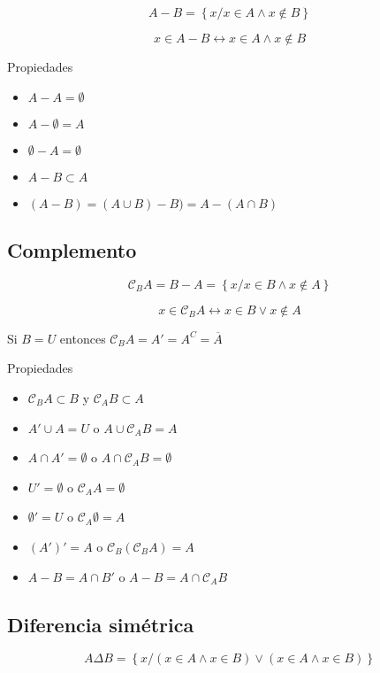 \documentclass[
  16pt,
]{krantz}
\providecommand{\tightlist}{%
  \setlength{\itemsep}{0pt}\setlength{\parskip}{0pt}}
\theoremstyle{definition}
\theoremstyle{definition}
\theoremstyle{definition}
\theoremstyle{definition}
\theoremstyle{remark}
\begin{document}
\[
A- B=\left\{x/x\in A\wedge x\notin B\right\}
\]

\[
x\in A- B\leftrightarrow x\in A\wedge x\notin B
\]

Propiedades

\begin{itemize}
\tightlist
\item
  \(A- A=\emptyset\)
\item
  \(A- \emptyset=A\)
\item
  \(\emptyset-A=\emptyset\)
\item
  \(A- B\subset A\)
\item
  \((A-B)=(A\cup B)-B)=A-(A\cap B)\)
\end{itemize}

\hypertarget{complemento}{%
\subsection{Complemento}\label{complemento}}

\[
\mathcal{C}_BA=B-A=\left\{x/x\in B\wedge x\notin A\right\}
\]

\[
x\in \mathcal{C}_BA\leftrightarrow x\in B\vee x\notin A
\]

Si \(B=U\) entonces \(\mathcal{C}_BA=A'=A^C=\overline{A}\)

Propiedades

\begin{itemize}
\tightlist
\item
  \(\mathcal{C}_BA\subset B\) y \(\mathcal{C}_AB\subset A\)
\item
  \(A'\cup A=U\) o \(A\cup \mathcal{C}_AB=A\)
\item
  \(A\cap A'=\emptyset\) o \(A\cap \mathcal{C}_AB=\emptyset\)
\item
  \(U'=\emptyset\) o \(\mathcal{C}_AA=\emptyset\)
\item
  \(\emptyset'=U\) o \(\mathcal{C}_A\emptyset=A\)
\item
  \((A')'=A\) o \(\mathcal{C}_B(\mathcal{C}_BA)=A\)
\item
  \(A-B=A\cap B'\) o \(A-B=A\cap \mathcal{C}_AB\)
\end{itemize}

\hypertarget{diferencia-simuxe9trica}{%
\subsection{Diferencia simétrica}\label{diferencia-simuxe9trica}}

\[
A\Delta B=\left\{x/(x\in A\wedge x\in B)\vee (x\in A\wedge x\in B)\right\}
\]
\end{document}
